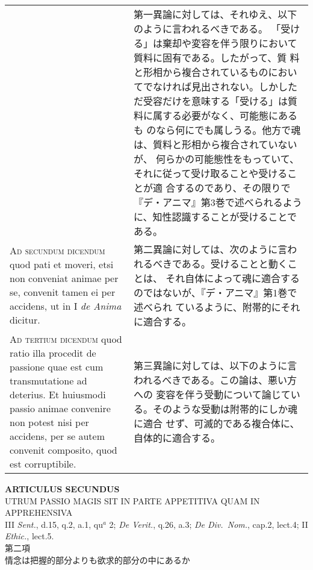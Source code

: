 \documentclass[10pt]{jsarticle} %
\begin{document}
\begin{longtable}{p{21em}p{21em}}
&

第一異論に対しては、それゆえ、以下のように言われるべきである。
「受ける」は棄却や変容を伴う限りにおいて質料に固有である。したがって、質
 料と形相から複合されているものにおいてでなければ見出されない。しかした
 だ受容だけを意味する「受ける」は質料に属する必要がなく、可能態にあるも
 のなら何にでも属しうる。他方で魂は、質料と形相から複合されていないが、
 何らかの可能態性をもっていて、それに従って受け取ることや受けることが適
 合するのであり、その限りで『デ・アニマ』第3巻で述べられるように、知性認識することが受けることである。

\\



{\scshape Ad secundum dicendum} quod pati et moveri, etsi non conveniat animae per
 se, convenit tamen ei per accidens, ut in I {\itshape de Anima} dicitur.

&

第二異論に対しては、次のように言われるべきである。受けることと動くことは、
 それ自体によって魂に適合するのではないが、『デ・アニマ』第1巻で述べられ
 ているように、附帯的にそれに適合する。


\\



{\scshape Ad tertium dicendum} quod ratio illa procedit de passione quae est cum
 transmutatione ad deterius. Et huiusmodi passio animae convenire non
 potest nisi per accidens, per se autem convenit composito, quod est
 corruptibile.

&

第三異論に対しては、以下のように言われるべきである。この論は、悪い方への
 変容を伴う受動について論じている。そのような受動は附帯的にしか魂に適合
 せず、可滅的である複合体に、自体的に適合する。


\end{longtable}
\newpage
{}
\begin{center}
 {\Large {\bf ARTICULUS SECUNDUS}}\\
 {\large UTRUM PASSIO MAGIS SIT IN PARTE APPETITIVA QUAM IN APPREHENSIVA}\\
 {\footnotesize III {\itshape Sent.}, d.15, q.2, a.1, qu$^a$ 2;
 {\itshape De Verit.}, q.26, a.3; {\itshape De Div.~Nom.}, cap.2,
 lect.4; II {\itshape Ethic.}, lect.5.}\\
 {\Large 第二項\\情念は把握的部分よりも欲求的部分の中にあるか}
\end{center}
\end{document}
